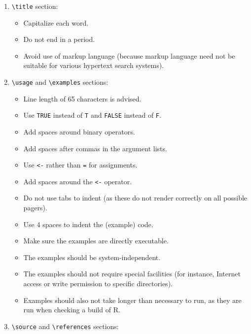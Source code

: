 \documentclass[
]{book}
\providecommand{\tightlist}{%
  \setlength{\itemsep}{0pt}\setlength{\parskip}{0pt}}
\begin{document}
\begin{enumerate}
\def\labelenumi{\arabic{enumi}.}
\tightlist
\item
  \texttt{\textbackslash{}title} section:

  \begin{itemize}
  \tightlist
  \item
    Capitalize each word.
  \item
    Do not end in a period.
  \item
    Avoid use of markup language (because markup language need not be suitable for various hypertext search systems).
  \end{itemize}
\item
  \texttt{\textbackslash{}usage} and \texttt{\textbackslash{}examples} sections:

  \begin{itemize}
  \tightlist
  \item
    Line length of 65 characters is advised.
  \item
    Use \texttt{TRUE} instead of \texttt{T} and \texttt{FALSE} instead of \texttt{F}.
  \item
    Add spaces around binary operators.
  \item
    Add spaces after commas in the argument lists.
  \item
    Use \texttt{\textless{}-} rather than \texttt{=} for assignments.
  \item
    Add spaces around the \texttt{\textless{}-} operator.
  \item
    Do not use tabs to indent (as these do not render correctly on all possible pagers).
  \item
    Use 4 spaces to indent the (example) code.
  \item
    Make sure the examples are directly executable.
  \item
    The examples should be system-independent.
  \item
    The examples should not require special facilities (for instance, Internet access or write permission to specific directories).
  \item
    Examples should also not take longer than necessary to run, as they are run when checking a build of R.
  \end{itemize}
\item
  \texttt{\textbackslash{}source} and \texttt{\textbackslash{}references} sections:


\end{enumerate}
\end{document}
